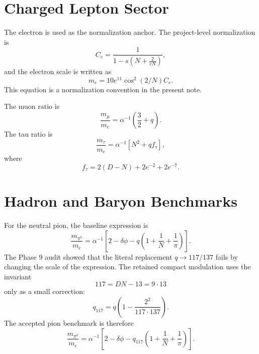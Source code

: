 \documentclass[11pt]{article}
\begin{document}
\section{Charged Lepton Sector}

The electron is used as the normalization anchor.  The project-level
normalization is
\begin{equation}
    C_e=\frac{1}{1-s\left(N+\frac{2}{eN}\right)},
\end{equation}
and the electron scale is written as
\begin{equation}
    m_e = 10e^{11}\cos^2(2/N)C_e .
\end{equation}
This equation is a normalization convention in the present note.

The muon ratio is
\begin{equation}
    \frac{m_\mu}{m_e}
    =
    \alpha^{-1}\left(\frac{3}{2}+q\right).
\end{equation}
The tau ratio is
\begin{equation}
    \frac{m_\tau}{m_e}
    =
    \alpha^{-1}\left[N^2+qf_\tau\right],
\end{equation}
where
\begin{equation}
    f_\tau = 2(D-N)+2e^{-2}+2e^{-7}.
\end{equation}

\section{Hadron and Baryon Benchmarks}

For the neutral pion, the baseline expression is
\begin{equation}
    \frac{m_{\pi^0}}{m_e}
    =
    \alpha^{-1}
    \left[
        2-\delta\phi
        -
        q\left(1+\frac{1}{N}+\frac{1}{\pi}\right)
    \right].
\end{equation}
The Phase 9 audit showed that the literal replacement $q\rightarrow117/137$
fails by changing the scale of the expression.  The retained compact
modulation uses the invariant
\begin{equation}
    117=DN-13=9\cdot13
\end{equation}
only as a small correction:
\begin{equation}
    q_{117}=q\left(1-\frac{2^2}{117\cdot137}\right).
\end{equation}
The accepted pion benchmark is therefore
\begin{equation}
    \frac{m_{\pi^0}}{m_e}
    =
    \alpha^{-1}
    \left[
        2-\delta\phi
        -
        q_{117}\left(1+\frac{1}{N}+\frac{1}{\pi}\right)
    \right].
\end{equation}
\end{document}
